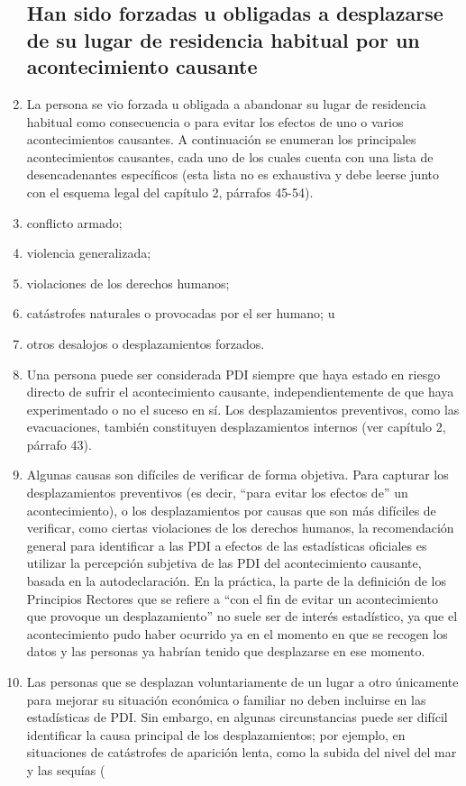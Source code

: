 \documentclass[
]{book}
\begin{document}
\begin{enumerate}
{  \subsection{Han sido forzadas u obligadas a desplazarse de su lugar de residencia habitual por un acontecimiento causante}\label{han-sido-forzadas-u-obligadas-a-desplazarse-de-su-lugar-de-residencia-habitual-por-un-acontecimiento-causante}}
\item
  La persona se vio forzada u obligada a abandonar su lugar de residencia habitual como consecuencia o para evitar los efectos de uno o varios acontecimientos causantes. A continuación se enumeran los principales acontecimientos causantes, cada uno de los cuales cuenta con una lista de desencadenantes específicos (esta lista no es exhaustiva y debe leerse junto con el esquema legal del capítulo 2, párrafos 45-54).
\item
  conflicto armado;
\item
  violencia generalizada;
\item
  violaciones de los derechos humanos;
\item
  catástrofes naturales o provocadas por el ser humano; u
\item
  otros desalojos o desplazamientos forzados.
\item
  Una persona puede ser considerada PDI siempre que haya estado en riesgo directo de sufrir el acontecimiento causante, independientemente de que haya experimentado o no el suceso en sí. Los desplazamientos preventivos, como las evacuaciones, también constituyen desplazamientos internos (ver capítulo 2, párrafo 43).
\item
  Algunas causas son difíciles de verificar de forma objetiva. Para capturar los desplazamientos preventivos (es decir, ``para evitar los efectos de'' un acontecimiento), o los desplazamientos por causas que son más difíciles de verificar, como ciertas violaciones de los derechos humanos, la recomendación general para identificar a las PDI a efectos de las estadísticas oficiales es utilizar la percepción subjetiva de las PDI del acontecimiento causante, basada en la autodeclaración. En la práctica, la parte de la definición de los Principios Rectores que se refiere a ``con el fin de evitar un acontecimiento que provoque un desplazamiento'' no suele ser de interés estadístico, ya que el acontecimiento pudo haber ocurrido ya en el momento en que se recogen los datos y las personas ya habrían tenido que desplazarse en ese momento.
\item
  Las personas que se desplazan voluntariamente de un lugar a otro únicamente para mejorar su situación económica o familiar no deben incluirse en las estadísticas de PDI. Sin embargo, en algunas circunstancias puede ser difícil identificar la causa principal de los desplazamientos; por ejemplo, en situaciones de catástrofes de aparición lenta, como la subida del nivel del mar y las sequías (

\end{enumerate}
\end{document}
